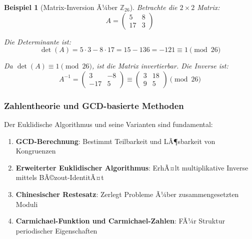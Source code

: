 ﻿\documentclass[12pt,a4paper]{article}
\newtheorem{example}{Beispiel}
\begin{document}
	\begin{example}[Matrix-Inversion Ã¼ber $\mathbb{Z}_{26}$]
		Betrachte die $2 \times 2$ Matrix:
		\begin{equation}
			A = \begin{pmatrix} 5 & 8 \\ 17 & 3 \end{pmatrix}
		\end{equation}
		
		Die Determinante ist:
		\begin{equation}
			\det(A) = 5 \cdot 3 - 8 \cdot 17 = 15 - 136 = -121 \equiv 1 \pmod{26}
		\end{equation}
		
		Da $\det(A) \equiv 1 \pmod{26}$, ist die Matrix invertierbar. Die Inverse ist:
		\begin{equation}
			A^{-1} = \begin{pmatrix} 3 & -8 \\ -17 & 5 \end{pmatrix} \equiv \begin{pmatrix} 3 & 18 \\ 9 & 5 \end{pmatrix} \pmod{26}
		\end{equation}
	\end{example}
	
	\subsubsection{Zahlentheorie und GCD-basierte Methoden}
	
	Der Euklidische Algorithmus und seine Varianten sind fundamental:
	\begin{enumerate}
		\item \textbf{GCD-Berechnung}: Bestimmt Teilbarkeit und LÃ¶sbarkeit von Kongruenzen
		\item \textbf{Erweiterter Euklidischer Algorithmus}: ErhÃ¤lt multiplikative Inverse mittels BÃ©zout-IdentitÃ¤t
		\item \textbf{Chinesischer Restesatz}: Zerlegt Probleme Ã¼ber zusammengesetzten Moduli
		\item \textbf{Carmichael-Funktion und Carmichael-Zahlen}: FÃ¼r Struktur periodischer Eigenschaften
	\end{enumerate}
	
\end{document}
